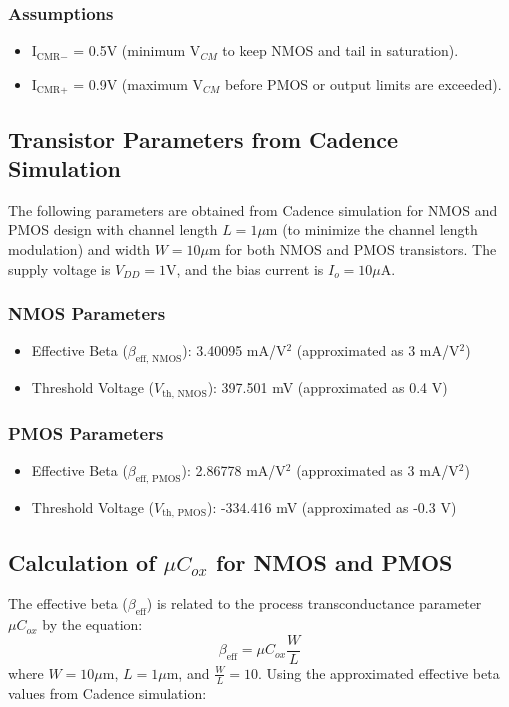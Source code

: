 \subsubsection{Assumptions}
\begin{itemize}
    \item I$_{\text{CMR}-}$ = 0.5V (minimum V$_{CM}$ to keep NMOS and tail in saturation).
    \item I$_{\text{CMR}+}$ = 0.9V (maximum V$_{CM}$ before PMOS or output limits are exceeded).
\end{itemize}

\subsection{Transistor Parameters from Cadence Simulation}
The following parameters are obtained from Cadence simulation for NMOS and PMOS design
with channel length $L = 1\mu$m (to minimize the channel length modulation) and width $W = 10\mu$m
for both NMOS and PMOS transistors. The supply voltage is $V_{DD} = 1$V, and the bias current is
$I_o = 10\mu$A.

\subsubsection{NMOS Parameters}
\begin{itemize}
    \item Effective Beta ($\beta_{\text{eff, NMOS}}$): 3.40095 mA/V$^2$ (approximated as 3 mA/V$^2$)
    \item Threshold Voltage ($V_{\text{th, NMOS}}$): 397.501 mV (approximated as 0.4 V)
\end{itemize}

\subsubsection{PMOS Parameters}
\begin{itemize}
    \item Effective Beta ($\beta_{\text{eff, PMOS}}$): 2.86778 mA/V$^2$ (approximated as 3 mA/V$^2$)
    \item Threshold Voltage ($V_{\text{th, PMOS}}$): -334.416 mV (approximated as -0.3 V)
\end{itemize}

\subsection{Calculation of $\mu C_{ox}$ for NMOS and PMOS}
The effective beta ($\beta_{\text{eff}}$) is related to the process transconductance parameter $\mu C_{ox}$ by the equation:
\begin{equation}
    \beta_{\text{eff}} = \mu C_{ox} \frac{W}{L}
\end{equation}
where $W = 10\mu$m, $L = 1\mu$m, and $\frac{W}{L} = 10$. Using the approximated effective beta values from Cadence simulation:

